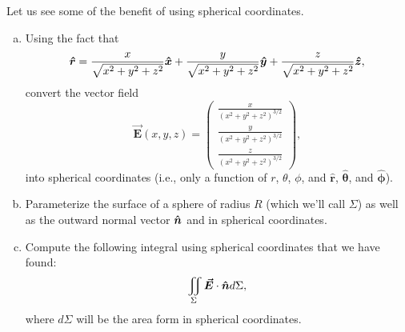 \documentclass[12pt]{article} %
\newcommand{\vecfieldE}{\boldsymbol{\vec{E}}}
\newcommand{\rhat}{\boldsymbol{\hat{r}}}
\newcommand{\thetahat}{\boldsymbol{\hat{\theta}}}
\newcommand{\phihat}{\boldsymbol{\hat{\phi}}}
\begin{document}
\newpage
\begin{problem}
    Let us see some of the benefit of using spherical coordinates. 
    \begin{enumerate}[(a)]
        \item Using the fact that 
        \[
        \rhat = \frac{x}{\sqrt{x^2+y^2+z^2}}\xhat + \frac{y}{\sqrt{x^2+y^2+z^2}}\yhat + \frac{z}{\sqrt{x^2+y^2+z^2}}\zhat,
        \]
        convert the vector field 
        \[
        \vecfieldE(x,y,z) = \begin{pmatrix} \frac{x}{(x^2+y^2+z^2)^{3/2}} \\ \frac{y}{(x^2+y^2+z^2)^{3/2}} \\ \frac{z}{(x^2+y^2+z^2)^{3/2}} \end{pmatrix},
        \] into spherical coordinates (i.e., only a function of $r$, $\theta$, $\phi$, and $\rhat$, $\thetahat$, and $\phihat$).
        \item Parameterize the surface of a sphere of radius $R$ (which we'll call $\Sigma$) as well as the outward normal vector $\boldsymbol{\hat{n}}$ and  in spherical coordinates.
        \item Compute the following integral using spherical coordinates that we have found:
        \[
        \iint_\Sigma \vecfieldE \cdot \unitvec d\Sigma,
        \]
        where $d\Sigma$ will be the area form in spherical coordinates.
    \end{enumerate}
\end{problem}
\end{document}
